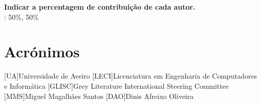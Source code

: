 \documentclass{report}
\begin{document}
\vspace{10pt}
\textbf{Indicar a percentagem de contribuição de cada autor.}\\

\autores : 50\%, 50\%\\

\chapter*{Acrónimos}
\begin{acronym}
[UA]{Universidade de Aveiro}
[LECI]{Licenciatura em Engenharia de Computadores e Informática}
[GLISC]{Grey Literature International Steering Committee}
[MMS]{Miguel Magalhães Santos}
[DAO]{Dinis Afreixo Oliveira}
\end{acronym}


\printbibliography
\end{document}
